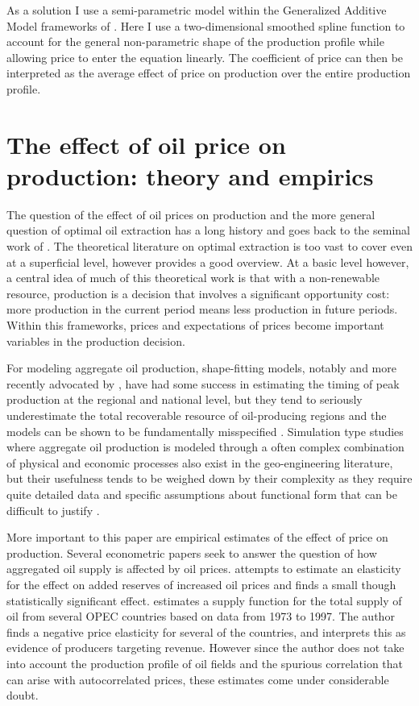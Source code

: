 \documentclass[12pt]{scrartcl} %
\begin{document}
As a solution I use a semi-parametric model within the Generalized Additive Model frameworks of \cite{hastie_generalized_1990}.  Here I use a two-dimensional smoothed spline function to account for the general non-parametric shape of the production profile while allowing price to enter the equation linearly.  The coefficient of price can then be interpreted as the average effect of price on production over the entire production profile.

\section{The effect of oil price on production: theory and empirics}
The question of the effect of oil prices on production and the more general question of optimal oil extraction has a long history and goes back to the seminal work of \citet{hotelling_economics_1931}.  The theoretical literature on optimal extraction is too vast to cover even at a superficial level, however \citet{krautkraemer_nonrenewable_1998} provides a good overview.  At a basic level however, a central idea of much of this theoretical work is that with a non-renewable resource, production is a decision that involves a significant opportunity cost: more production in the current period means less production in future periods.  Within this frameworks, prices and expectations of prices become important variables in the production decision.  

For modeling aggregate oil production, shape-fitting models, notably \citet{hubbert_energy_1962} and more recently advocated by \citet{deffeyes_hubberts_2001}, have had some success in estimating the timing of peak production at the regional and national level, but they tend to seriously underestimate the total recoverable resource of oil-producing regions and the models can be shown to be fundamentally misspecified \citep{boyce_prediction_2013}.   Simulation type studies where aggregate oil production is modeled through a often complex combination of physical and economic processes also exist in the geo-engineering literature, but their usefulness tends to be weighed down by their complexity as they require quite detailed data and specific assumptions about functional form that can be difficult to justify \citet{brandt_review_2010}.

More important to this paper are empirical estimates of the effect of price on production. Several econometric papers seek to answer the question of how aggregated oil supply is affected by oil prices.  \citet{farzin_impact_2001} attempts to estimate an elasticity for the effect on added reserves of increased oil prices and finds a small though statistically significant effect.  \citet{ramcharran_oil_2002} estimates a supply function for the total supply of oil from several OPEC countries based on data from 1973 to 1997.  The author finds a negative price elasticity for several of the countries, and interprets this as evidence of producers targeting revenue.  However since the author does not take into account the production profile of oil fields and the spurious correlation that can arise with autocorrelated prices, these estimates come under considerable doubt.  
\end{document}
